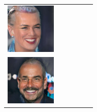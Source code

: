 \documentclass{article}
\newcommand{\pganw}{0.95in}
\begin{document}
\begin{table}[htbp]
\begin{center}
\begin{tabular}{cc|cc|cc}
\includegraphics[width=\pganw]{figures/pgan/55_base_iso_MH.jpg} \\
\includegraphics[width=\pganw]{figures/pgan/56_base_iso_base.jpg} &

\end{tabular}
\end{center}
\end{table}
\end{document}
